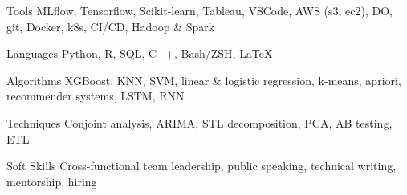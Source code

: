 

\begin{cvskills}

  \cvskill
    {Tools} %
    {MLflow, Tensorflow, Scikit-learn, Tableau, VSCode, AWS (s3, ec2), DO, git, Docker, k8s, CI/CD, Hadoop \& Spark} %

  \cvskill
    {Languages} %
    {Python, R, SQL, C++, Bash/ZSH, {\LaTeX{}}} %

  \cvskill
    {Algorithms} %
    {XGBoost, KNN, SVM, linear \& logistic regression, k-means, apriori, recommender systems, LSTM, RNN} %

  \cvskill
    {Techniques} %
    {Conjoint analysis, ARIMA, STL decomposition, PCA, AB testing, ETL} %

  \cvskill
    {Soft Skills} %
    {Cross-functional team leadership, public speaking, technical writing, mentorship, hiring} %

\end{cvskills}
